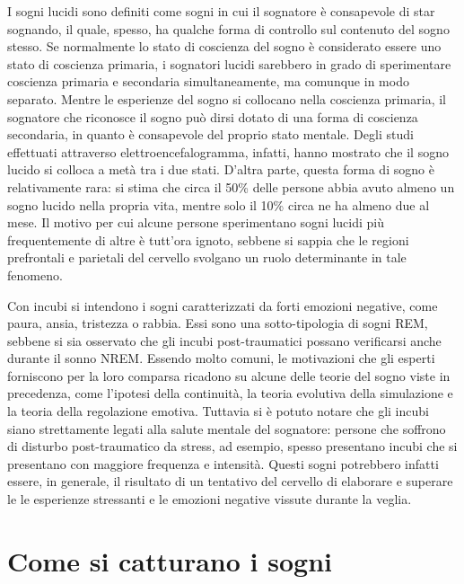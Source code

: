 
I sogni lucidi sono definiti come sogni in cui il sognatore è consapevole di star sognando, il quale, spesso, ha
qualche forma di controllo sul contenuto del sogno stesso.
Se normalmente lo stato di coscienza del sogno è considerato essere uno stato di coscienza primaria,
i sognatori lucidi sarebbero in grado di sperimentare coscienza primaria e secondaria simultaneamente, ma comunque
in modo separato.
Mentre le esperienze del sogno si collocano nella coscienza primaria, il sognatore che
riconosce il sogno può dirsi dotato di una forma di coscienza secondaria, in quanto è consapevole del proprio
stato mentale.
Degli studi effettuati attraverso elettroencefalogramma, infatti, hanno mostrato che il sogno lucido si colloca a metà
tra i due stati. %
D'altra parte, questa forma di sogno è relativamente rara: si stima che circa il 50\% delle persone abbia avuto almeno
un sogno lucido nella propria vita, mentre solo il 10\% circa ne ha almeno due al mese.
Il motivo per cui alcune persone sperimentano sogni lucidi più frequentemente di altre è tutt'ora ignoto, sebbene
si sappia che le regioni prefrontali e parietali del cervello svolgano un ruolo determinante in tale fenomeno.


Con incubi si intendono i sogni caratterizzati da forti emozioni negative, come paura, ansia, tristezza o rabbia.
Essi sono una sotto-tipologia di sogni REM, sebbene si sia osservato che gli incubi post-traumatici possano
verificarsi anche durante il sonno NREM.
Essendo molto comuni, le motivazioni che gli esperti forniscono per la loro comparsa ricadono su alcune delle
teorie del sogno viste in precedenza, come l'ipotesi della continuità, la teoria evolutiva della simulazione e
la teoria della regolazione emotiva.
Tuttavia si è potuto notare che gli incubi siano strettamente legati alla salute mentale del sognatore: persone
che soffrono di disturbo post-traumatico da stress, ad esempio, spesso presentano incubi che si presentano con
maggiore frequenza e intensità.
Questi sogni potrebbero infatti essere, in generale, il risultato di un tentativo del cervello di elaborare e superare
le le esperienze stressanti e le emozioni negative vissute durante la veglia.

\section{Come si catturano i sogni}

